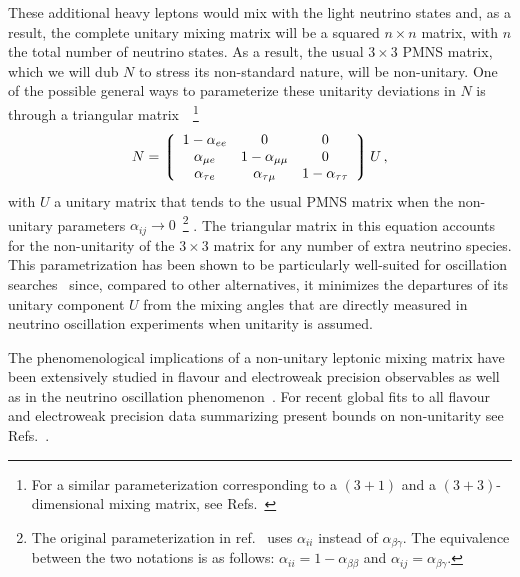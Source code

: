 These additional heavy leptons would mix with the light neutrino
states and, as a result, the complete unitary mixing matrix will be a
squared $n \times n$ matrix, with $n$ the total number of neutrino
states. As a result, the usual $3\times 3$ PMNS matrix, which we will dub $N$ to stress its non-standard nature, will be
non-unitary. One of the possible general ways to parameterize these unitarity deviations in $N$ is through a triangular matrix~\cite{Escrihuela:2015wra}~\footnote{For a similar parameterization corresponding to a $(3+1)$ and a $(3+3)$-dimensional mixing matrix,  see Refs.~\cite{Xing:2007zj,Xing:2011ur}}
 \begin{equation}
  N = 
 \left\lgroup
 \begin{array}{ccc} 
 1-\alpha_{ee} & 0 & 0 \\
 \alpha_{\mu e} & 1-\alpha_{\mu \mu} & 0 \\
  \alpha_{\tau e} & \alpha_{\tau \mu} & 1-\alpha_{\tau \tau}
 \end{array}
 \right \rgroup U \,,
 \label{eq:triangular}
 \end{equation}
with $U$ a unitary matrix that tends to the usual PMNS matrix when the non-unitary parameters $\alpha_{ij} \rightarrow 0$~\footnote{The original parameterization in ref.~\cite{Escrihuela:2015wra} uses $\alpha_{ii}$ instead of $\alpha_{\beta\gamma}$. The equivalence between the two notations is as follows: $\alpha_{ii} = 1-\alpha_{\beta\beta}$ and $\alpha_{ij} = \alpha_{\beta\gamma}$.} .
%
 The triangular
matrix in this equation accounts for the non-unitarity of the $3\times 3$ matrix for any number of extra neutrino species. This parametrization has been shown to be particularly well-suited for oscillation searches~\cite{Escrihuela:2015wra,Blennow:2016jkn} since, compared to other alternatives, it minimizes the departures of its unitary component $U$ from the mixing angles that are directly measured in neutrino oscillation experiments when unitarity is assumed.

The phenomenological implications of a non-unitary leptonic mixing matrix have been extensively studied in flavour and electroweak precision observables as well as in the neutrino oscillation phenomenon~\cite{Shrock:1980vy,Schechter:1980gr,Shrock:1980ct,Shrock:1981wq,Langacker:1988ur,Bilenky:1992wv,Nardi:1994iv,Tommasini:1995ii,Antusch:2006vwa,FernandezMartinez:2007ms,Antusch:2008tz,Biggio:2008in,Antusch:2009pm,Forero:2011pc,Alonso:2012ji,Antusch:2014woa,Abada:2015trh,Fernandez-Martinez:2015hxa,Escrihuela:2015wra,Parke:2015goa,Miranda:2016wdr,Fong:2016yyh,Escrihuela:2016ube}. For recent global fits to all flavour and electroweak precision data summarizing present bounds on non-unitarity see Refs.~\cite{Antusch:2014woa,Fernandez-Martinez:2016lgt}. 

